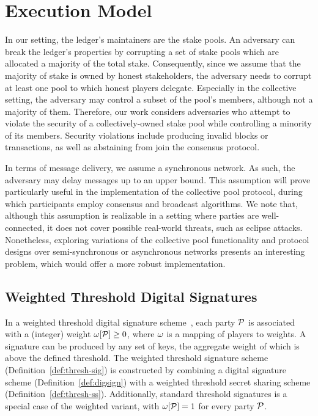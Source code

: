 \section{Execution Model}\label{sec:execution-model}

In our setting, the ledger's maintainers are the stake pools. An adversary can
break the ledger's properties by corrupting a set of stake pools which are
allocated a majority of the total stake. Consequently, since we assume that the
majority of stake is owned by honest stakeholders, the adversary needs to
corrupt at least one pool to which honest players delegate. Especially in the
collective setting, the adversary may control a subset of the pool's members,
although not a majority of them. Therefore, our work considers adversaries who
attempt to violate the security of a collectively-owned stake pool while
controlling a minority of its members. Security violations include producing
invalid blocks or transactions, as well as abstaining from join the consensus
protocol.

In terms of message delivery, we assume a synchronous network.  As such, the
adversary may delay messages up to an upper bound. This assumption will prove
particularly useful in the implementation of the collective pool protocol,
during which participants employ consensus and broadcast algorithms. We note
that, although this assumption is realizable in a setting where parties are
well-connected, it does not cover possible real-world threats, such as eclipse
attacks. Nonetheless, exploring variations of the collective pool functionality
and protocol designs over semi-synchronous or asynchronous networks presents an
interesting problem, which would offer a more robust implementation.

\subsection{Weighted Threshold Digital Signatures}\label{sec:thold-sign}

In a weighted threshold digital signature
scheme~\cite{morillo1999weighted,Shamir79}, each party $\mathcal{P}$ is associated
with a (integer) weight $\omega[\mathcal{P}] \geq 0$, where $\omega$ is a mapping of
players to weights. A signature can be produced by any set of keys, the
aggregate weight of which is above the defined threshold. The weighted
threshold signature scheme (Definition~\ref{def:thresh-sig}) is constructed by
combining a digital signature scheme (Definition~\ref{def:digsign}) with a
weighted threshold secret sharing scheme (Definition~\ref{def:thresh-ss}).
Additionally, standard threshold signatures is a special case of the weighted
variant, with $\omega[\mathcal{P}] = 1$ for every party $\mathcal{P}$.

